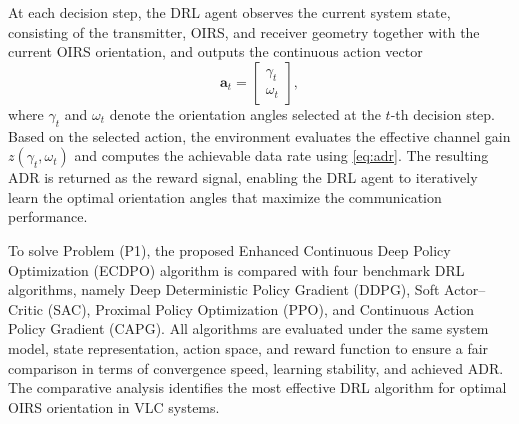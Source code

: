 At each decision step, the DRL agent observes the current system state,
consisting of the transmitter, OIRS, and receiver geometry together with the
current OIRS orientation, and outputs the continuous action vector
\begin{equation}
\mathbf{a}_t=
\begin{bmatrix}
\gamma_t \\
\omega_t
\end{bmatrix},
\end{equation}
where $\gamma_t$ and $\omega_t$ denote the orientation angles selected at the
$t$-th decision step. Based on the selected action, the environment evaluates
the effective channel gain $z(\gamma_t,\omega_t)$ and computes the achievable
data rate using \eqref{eq:adr}. The resulting ADR is returned as the reward
signal, enabling the DRL agent to iteratively learn the optimal orientation
angles that maximize the communication performance.

To solve Problem (P1), the proposed Enhanced Continuous Deep Policy
Optimization (ECDPO) algorithm is compared with four benchmark DRL algorithms,
namely Deep Deterministic Policy Gradient (DDPG), Soft Actor--Critic (SAC),
Proximal Policy Optimization (PPO), and Continuous Action Policy Gradient
(CAPG). All algorithms are evaluated under the same system model, state
representation, action space, and reward function to ensure a fair comparison
in terms of convergence speed, learning stability, and achieved ADR. The
comparative analysis identifies the most effective DRL algorithm for optimal
OIRS orientation in VLC systems.
